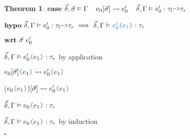 \documentclass[acmsmall]{acmart}
\theoremstyle{definition}
\newtheorem{theorem}{Theorem}[section]
\begin{document}
\begin{theorem}
    \item \Z $\B{case }
      \vec{\delta}, \vec{\sigma} \satisfies \Gamma
      \I
      e_0[\vec{\sigma}] \rightsquigarrow e_0'
      \I
      \vec{\delta}, \Gamma \satisfies e_0' \hastype \tau_l \obj{->} \tau_r
    $
    \item \Z $\B{hypo}\ 
      \vec{\delta}, \Gamma \satisfies e_0' \hastype \tau_l \obj{->} \tau_r
      \implies
      \vec{\delta}, \Gamma \satisfies \obj{$e_0'$($e_1$)} \hastype \tau_r
    $
    \item \Z $ 
    \textbf{wrt}\ \vec{\sigma}\ e_0' 
    $
      \item \Z\Z $\vec{\delta}, \Gamma \satisfies e_0'\obj{(}e_1\obj{)} \hastype \tau_r$ by application 
      \item \Z\Z $e_0[\vec{\sigma}]\obj{(}e_1\obj{)} \rightsquigarrow e_0'\obj{(}e_1\obj{)}$
      \item \Z\Z ($e_0\obj{(}e_1\obj{)})[\vec{\sigma}] \rightsquigarrow e_0'\obj{(}e_1\obj{)}$
      \item \Z\Z $\vec{\delta}, \Gamma \satisfies e_0\obj{(}e_1\obj{)} \hastype \tau_r$ 

    \item \Z $\vec{\delta}, \Gamma \satisfies e_0\obj{(}e_1\obj{)} \hastype \tau_r$ by induction
  \item $\square$
\end{theorem}
\end{document}
